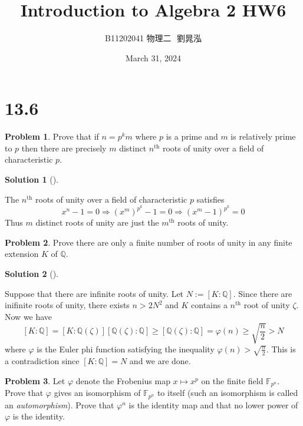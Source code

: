 \documentclass{article}
\title{Introduction to Algebra 2 HW6}
\author{B11202041 物理二 $ $ 劉晁泓}
\date{March 31, 2024}
\theoremstyle{definition}
\newtheorem{prob}{Problem}
\newtheorem*{sol}{Solution}
\newenvironment{sols}[1][]{%
  \begin{sol}[#1]$ $\par\nobreak\ignorespaces
}{%
  \end{sol}
}
\begin{document}
\maketitle
\thispagestyle{fancy}
\renewcommand{\footrulewidth}{0.4pt}
\cfoot{\thepage}
\renewcommand{\headrulewidth}{0.4pt}

\section*{13.6}

\setcounter{prob}{3}
\begin{prob}
	Prove that if $n = p^k m$ where $p$ is a prime and $m$ is relatively prime to $p$ then there are precisely $m$ distinct $n^{\text{th}}$ roots of unity over a field of characteristic $p$.
\end{prob}

\begin{sols}
	The $n^{\text{th}}$ roots of unity over a field of characteristic $p$ satisfies
	\[
		x^n - 1 = 0 \Rightarrow (x^m)^{p^k} - 1 = 0 \Rightarrow (x^m - 1)^{p^k} = 0
	\]
	Thus $m$ distinct roots of unity are just the $m^{\text{th}}$ roots of unity. 
\end{sols}

\begin{prob}
	Prove there are only a finite number of roots of unity in any finite extension $K$ of $\mathbb{Q}$.
\end{prob}

\begin{sols}
	Suppose that there are infinite roots of unity.
	Let $N := [K:\mathbb{Q}]$.
	Since there are inifinite roots of unity, there exists $n > 2 N^2$ and $K$ contains a $n^{\text{th}}$ root of unity $\zeta$.
	Now we have
	\[
		[K:\mathbb{Q}] = [K:\mathbb{Q}(\zeta)][\mathbb{Q}(\zeta):\mathbb{Q}] \geq [\mathbb{Q}(\zeta):\mathbb{Q}] = \varphi(n) \geq \sqrt{\frac{n}{2}} > N
	\]
	where $\varphi$ is the Euler phi function satisfying the inequality $\varphi(n) > \sqrt{\frac{n}{2}}$.
	This is a contradiction since $[K:\mathbb{Q}] = N$ and we are done.
\end{sols}

\setcounter{prob}{9}
\begin{prob}
	Let $\varphi$ denote the Frobenius map $x \mapsto x^p$ on the finite field $\mathbb{F}_{p^n}$.
	Prove that $\varphi$ gives an isomorphism of $\mathbb{F}_{p^n}$ to itself (such an isomorphism is called an \textit{automorphism}).
	Prove that $\varphi^n$ is the identity map and that no lower power of $\varphi$ is the identity.
\end{prob}
\end{document}
